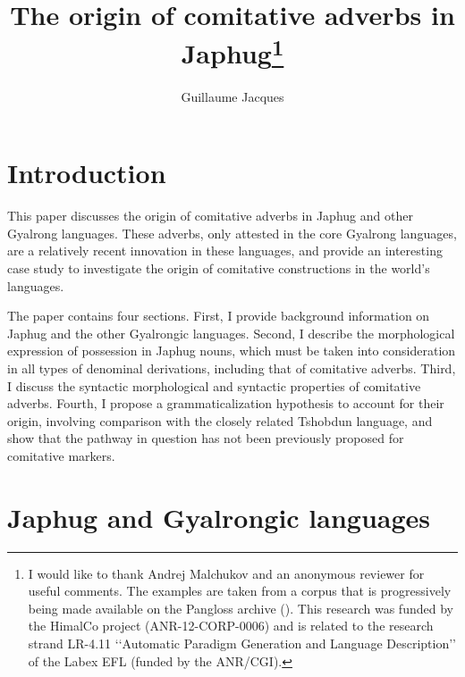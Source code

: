 \documentclass[oldfontcommands,oneside,a4paper,11pt]{article}
\begin{document}
 
 \title{The origin of comitative adverbs in Japhug\footnote{I would like to thank Andrej Malchukov and an anonymous reviewer for useful comments. The examples are taken from a corpus that is progressively being made available on the Pangloss archive (\citealt{michailovsky14pangloss}). This research was funded by the HimalCo project (ANR-12-CORP-0006) and is related to the research strand LR-4.11 ‘‘Automatic Paradigm Generation and Language Description’’ of the Labex EFL (funded by the ANR/CGI). }}
 \author{Guillaume Jacques }
 \maketitle 
 
 \linenumbers 

\section*{Introduction}
This paper discusses the origin of comitative adverbs in Japhug and other Gyalrong languages. These adverbs, only attested in the core Gyalrong languages, are a relatively recent innovation in these languages, and provide an interesting case study to investigate the origin of comitative constructions in the world's languages.


The paper contains four sections.  First, I provide background information on Japhug and the other Gyalrongic languages. Second, I describe the morphological expression of possession in Japhug nouns, which must be taken into consideration in all types of denominal derivations, including that of comitative adverbs. Third, I discuss the syntactic morphological and syntactic properties of comitative adverbs. Fourth, I propose a grammaticalization hypothesis to account for their origin, involving comparison with the closely related Tshobdun language, and show that the pathway in question has not been previously proposed for comitative markers.

 \section{Japhug and Gyalrongic languages} 
\end{document}

